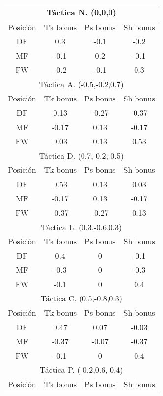 \documentclass[a4paper,9pt]{article}
\begin{document}
\begin{table}
  \begin{center}
    \begin{tabular}{c c c c}
    	\multicolumn{4}{c}{Táctica N. (0,0,0)}\\
      \hline
      Posición & Tk bonus & Ps bonus & Sh bonus\\
      \hline
      DF & 0.3 & -0.1 & -0.2 \\
      MF & -0.1 & 0.2 & -0.1 \\
      FW & -0.2 & -0.1 & 0.3 \\
      \hline\hline
      \multicolumn{4}{c}{Táctica A. (-0.5,-0.2,0.7)}\\
      \hline
      Posición & Tk bonus & Ps bonus & Sh bonus\\
      \hline
      DF & 0.13 & -0.27 & -0.37 \\
      MF & -0.17 & 0.13 & -0.17 \\
      FW & 0.03 & 0.13 & 0.53 \\
      \hline\hline
      \multicolumn{4}{c}{Táctica D. (0.7,-0.2,-0.5)}\\
      \hline
      Posición & Tk bonus & Ps bonus & Sh bonus\\
      \hline
      DF & 0.53 & 0.13 & 0.03 \\
      MF & -0.17 & 0.13 & -0.17 \\
      FW & -0.37 & -0.27 & 0.13 \\
      \hline\hline
      \multicolumn{4}{c}{Táctica L. (0.3,-0.6,0.3)}\\
      \hline
      Posición & Tk bonus & Ps bonus & Sh bonus\\
      \hline
      DF & 0.4 & 0 & -0.1 \\
      MF & -0.3 & 0 & -0.3 \\
      FW & -0.1 & 0 & 0.4 \\
      \hline\hline
      \multicolumn{4}{c}{Táctica C. (0.5,-0.8,0.3)}\\
      \hline
      Posición & Tk bonus & Ps bonus & Sh bonus\\
      \hline
      DF & 0.47 & 0.07 & -0.03 \\
      MF & -0.37 & -0.07 & -0.37 \\
      FW & -0.1 & 0 & 0.4 \\
      \hline\hline
      \multicolumn{4}{c}{Táctica P. (-0.2,0.6,-0.4)}\\
      \hline
      Posición & Tk bonus & Ps bonus & Sh bonus\\

\end{tabular}
\end{center}
\end{table}
\end{document}
